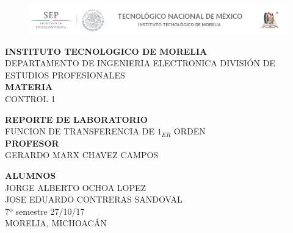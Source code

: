 \documentclass[letterpaper,10pt]{article}
\begin{document}
	
\begin{titlepage}
	\begin{figure}[h!]
		\begin{center}
			\vspace{1.5cm}
			\includegraphics[scale= .5, ]{encabezado.png}
			\label{escudouam1}
			\vspace{-1cm}
		\end{center}
	\end{figure}
	\begin{center}
		\vspace{1cm} 
		\LARGE{\textbf{INSTITUTO TECNOLOGICO DE MORELIA}} \\
		\vspace{1cm}
		DEPARTAMENTO DE INGENIERIA ELECTRONICA
		DIVISIÓN DE ESTUDIOS PROFESIONALES \\  
		\vspace{2.3cm} {\large \textbf{MATERIA}\\ \LARGE CONTROL 1}
		
		
		\vspace{1.5cm} {\large \textbf{REPORTE DE LABORATORIO}\\ \LARGE FUNCION DE TRANSFERENCIA DE $1_{ER}$ ORDEN}\\ 
		
		\vspace{1.5cm} {\large \textbf{PROFESOR}\\ \LARGE GERARDO MARX CHAVEZ CAMPOS}
		
		\vspace{1.5cm} {\large \textbf{ALUMNOS}\\ \large JORGE ALBERTO OCHOA LOPEZ\\JOSE EDUARDO CONTRERAS SANDOVAL} \\
		\normalsize{7º semestre
			\hfill {27/10/17}}\\ 
		MORELIA, MICHOACÁN
	\end{center}
\end{titlepage}
\pagebreak
\justify
\tableofcontents
\pagebreak
{}
	
\end{document}
